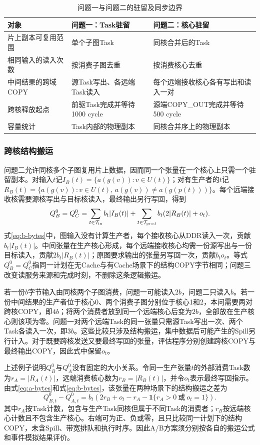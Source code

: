 \begin{table}[H]\centering\caption{问题一与问题二的驻留及同步边界}\label{tab:b-rule-contrast}
\begin{tabularx}{\linewidth}{lYY}\toprule
对象 & 问题一：Task驻留 & 问题二：核心驻留\\\midrule
片上副本可复用范围 & 单个子图Task & 同核合并后的Task\\
相同输入的读入次数 & 按消费子图去重 & 按消费核心去重\\
中间结果的跨域COPY & 源Task写出、各远端Task读入 & 每个远端接收核心各有写出和读入一对\\
跨核释放起点 & 前驱Task完成并等待1000 cycle & 源端COPY\_OUT完成并等待500 cycle\\
容量统计 & Task内部的物理副本 & 同核合并序上的物理副本\\\bottomrule
\end{tabularx}\end{table}

\subsubsection{跨核结构搬运}
问题二允许同核多个子图复用片上数据，因而同一个张量在一个核心上只需一个驻留副本。对输入$t$记$I_B(t)=\{a(g(v)):v\in U(t)\}$；对有生产者的$t$记$R_B(t)=\{a(g(v)):v\in U(t),\,a(g(v))\ne a(g(p(t)))\}$。每个远端接收核需要源核写出与目标核读入，最终输出另行写回，得到
\begin{equation}
Q_B^0=Q_C^0=
\sum_{t\in\mathcal T_{\rm in}}b_t|I_B(t)|
+\sum_{t\in\mathcal T_{\rm prod}}b_t(2|R_B(t)|+o_t).
\label{eq:b-bytes}
\end{equation}
式\eqref{eq:b-bytes}中，图输入没有计算生产者，每个接收核心从DDR读入一次，贡献$b_t|I_B(t)|$。中间张量在生产核心形成，每个远端接收核心均需一份源写出与一份目标读入，贡献$2b_t|R_B(t)|$；原图要求输出的张量另写回一次，贡献$b_t o_t$。等式$Q_B^0=Q_C^0$指同一计划在无Cache与有Cache场景下的结构COPY字节相同；问题三改变读服务来源和完成时刻，不删除这条逻辑搬运。

若一份$b$字节输入由同核两个子图消费，问题一可能读入$2b$，问题二只读入$b$。若一份中间结果的生产者位于核心0、两个消费子图分别位于核心1和2，本问需要两对跨核COPY，即$4b$；将两个消费者放到同一个远端核心后变为$2b$，全部放在生产核心则该项为零。问题一对两个远端Task的同一张量只需源Task写出一次、两个Task各读入一次，即$3b$。这些比较只涉及结构搬运，集中数据后可能产生的Spill另行计入。对于既要跨核发送又要最终写回的张量，评估程序分别创建跨核COPY与最终输出COPY，因此式中保留$o_t$。

上述例子说明$Q_B^0$与$Q_A^0$没有固定的大小关系。令同一生产张量$t$的外部消费Task数为$r_A=|R_A(t)|$，远端消费核心数为$r_B=|R_B(t)|$，并令$o_t$表示最终写回指示。由式\eqref{eq:a-bytes}和式\eqref{eq:b-bytes}，该张量在两种场景下的结构搬运之差为
\begin{equation}
Q_{B,t}^0-Q_{A,t}^0
=b_t\left(2r_B+o_t-r_A-\mathbf 1\{r_A>0\ \text{或}\ o_t=1\}\right).
\label{eq:ab-structure-difference}
\end{equation}
其中$r_A$按Task计数，包含与生产Task同核但属于不同Task的消费者；$r_B$按远端核心计数且不包含生产核心。右端可为正、负或零，且只比较同一计划下的结构COPY，未含Spill、带宽排队和执行时序。因此A/B方案须分别按各自的搬运公式和事件模拟结果评价。


